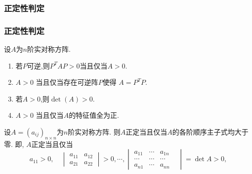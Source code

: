 \subsubsection{正定性判定}
\begin{frame}\frametitle{正定性判定}
\begin{proposition}
设$A$为$n$阶实对称方阵.
\pp
\begin{enumerate}
\item 若$P$可逆,则$P^TAP>0$当且仅当$A>0$.\qquad {}
\pp
\item $A>0$ 当且仅当存在可逆阵$P$使得 $A=P^TP$. \quad{}
\pp
\item 若$A>0$,则$\det(A)>0$.
\item $A>0$ 当且仅当$A$的特征值全为正.
\end{enumerate}
\end{proposition}
\pp

\begin{theorem}
设$A=(a_{ij})_{n\times n}$为$n$阶实对称方阵.
\pp
则$A$正定当且仅当$A$的各阶顺序主子式均大于零.
\pp
即, $A$正定当且仅当
\[a_{11}>0,\quad \begin{vmatrix}a_{11}&a_{12}\\a_{21}&a_{22}\end{vmatrix}>0,\cdots,\begin{vmatrix}a_{11}&\cdots&a_{1n}\\\cdots&\cdots&\cdots&\\a_{n1}&\cdots&a_{nn}\end{vmatrix}=\det{A}>0,\]
\end{theorem}
\pp

\end{frame}






